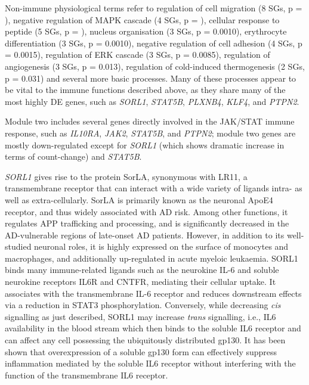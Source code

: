 Non-immune physiological terms refer to regulation of cell migration (8 SGs, p = ), negative regulation of MAPK cascade (4 SGs, p = ), cellular response to peptide (5 SGs, p = ), nucleus organisation (3 SGs, p = 0.0010), erythrocyte differentiation (3 SGs, p = 0.0010), negative regulation of cell adhesion (4 SGs, p = 0.0015), regulation of ERK cascade (3 SGs, p = 0.0085), regulation of angiogenesis (3 SGs, p = 0.013), regulation of cold-induced thermogenesis (2 SGs, p = 0.031) and several more basic processes. Many of these processes appear to be vital to the immune functions described above, as they share many of the most highly DE genes, such as \emph{SORL1}, \emph{STAT5B}, \emph{PLXNB4}, \emph{KLF4}, and \emph{PTPN2}. 

Module two includes several genes directly involved in the JAK/STAT immune response, such as \emph{IL10RA}, \emph{JAK2}, \emph{STAT5B}, and \emph{PTPN2}; module two genes are mostly down-regulated except for \emph{SORL1} (which shows dramatic increase in terms of count-change) and \emph{STAT5B}.

\emph{SORL1} gives rise to the protein SorLA, synonymous with LR11, a transmembrane receptor that can interact with a wide variety of ligands intra- as well as extra-cellularly.\cite{Yin2015} SorLA is primarily known as the neuronal ApoE4 receptor, and thus widely associated with AD risk. Among other functions, it regulates APP trafficking and processing, and is significantly decreased in the AD-vulnerable regions of late-onset AD patients.\cite{Yin2015} However, in addition to its well-studied neuronal roles, it is highly expressed on the surface of monocytes and macrophages, and additionally up-regulated in acute myeloic leukaemia.\cite{Sakai2012} SORL1 binds many immune-related ligands such as the neurokine IL-6 and soluble neurokine receptors IL6R and CNTFR, mediating their cellular uptake. It associates with the transmembrane IL-6 receptor and reduces downstream effects via a reduction in STAT3 phosphorylation.\cite{Larsen2017} Conversely, while decreasing \emph{cis} signalling as just described, SORL1 may increase \emph{trans} signalling, i.e., IL6 availability in the blood stream which then binds to the soluble IL6 receptor and can affect any cell possessing the ubiquitously distributed gp130.\cite{Rabe2008} It has been shown that overexpression of a soluble gp130 form can effectively suppress inflammation mediated by the soluble IL6 receptor without interfering with the function of the transmembrane IL6 receptor.\cite{Rabe2008}

